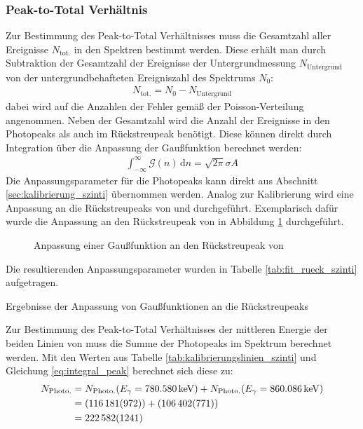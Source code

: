 \documentclass[11pt, a4paper]{article}
\numberwithin{equation}{section}
\begin{document}
\subsubsection{Peak-to-Total Verhältnis}
Zur Bestimmung des Peak-to-Total Verhältnisses muss die Gesamtzahl aller Ereignisse $N_\mathrm{tot.}$ in den Spektren bestimmt werden.
Diese erhält man durch Subtraktion der Gesamtzahl der Ereignisse der Untergrundmessung $N_\mathrm{Untergrund}$ von der untergrundbehafteten Ereigniszahl des Spektrums $N_0$:
\begin{align}
	N_\mathrm{tot.} = N_\mathrm{0} - N_\mathrm{Untergrund}
\end{align}
dabei wird auf die Anzahlen der Fehler gemäß der Poisson-Verteilung angenommen.
Neben der Gesamtzahl wird die Anzahl der Ereignisse in den Photopeaks als auch im Rückstreupeak benötigt.
Diese können direkt durch Integration über die Anpassung der Gaußfunktion berechnet werden:
\begin{align}
\int_{-\infty}^{\infty} \mathcal{G}(n) \, \mathrm{d}n = \sqrt{2 \pi} \sigma A
\label{eq:integral_peak}
\end{align}
Die Anpassungsparameter für die Photopeaks kann direkt aus Abschnitt \ref{sec:kalibrierung_szinti} übernommen werden.
Analog zur Kalibrierung wird eine Anpassung an die Rückstreupeaks von  und  durchgeführt.
Exemplarisch dafür wurde die Anpassung an den Rückstreupeak von  in Abbildung \ref{fig:fit_rueck_szinti} durchgeführt.
\begin{figure}[h]
	\centering
	
	\caption{Anpassung einer Gaußfunktion an den Rückstreupeak von }
	\label{fig:fit_rueck_szinti}
\end{figure}
Die resultierenden Anpassungsparameter wurden in Tabelle \ref{tab:fit_rueck_szinti} aufgetragen.
\begin{table}[ht]
	\centering
	
	\caption{Ergebnisse der Anpassung von Gaußfunktionen an die Rückstreupeaks}
	\label{tab:fit_rueck_szinti}
\end{table}
Zur Bestimmung des Peak-to-Total Verhältnisses der mittleren Energie der beiden Linien von  muss die Summe der Photopeaks im Spektrum berechnet werden.
Mit den Werten aus Tabelle \ref{tab:kalibrierungslinien_szinti} und Gleichung \eqref{eq:integral_peak} berechnet sich diese zu:
\begin{align*}
	N_\mathrm{Photo.} &= N_\mathrm{Photo.}(E_\gamma = \SI{780.580}{\kilo\electronvolt}) +  N_\mathrm{Photo.}(E_\gamma = \SI{860.086}{\kilo\electronvolt})\\
	&= (\num{116181 +- 972}) + (\num{106402 +- 771})\\
	&= \num{222582 +- 1241}
\end{align*}
\end{document}
